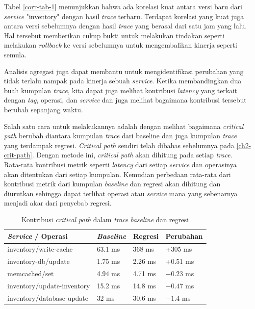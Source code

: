 Tabel \ref{corr-tab-1} menunjukkan bahwa ada korelasi kuat antara versi baru dari \textit{service} "inventory" dengan hasil \textit{trace} terbaru. Terdapat korelasi yang kuat juga antara versi sebelumnya dengan hasil \textit{trace} yang berasal dari satu jam yang lalu. Hal tersebut memberikan cukup bukti untuk melakukan tindakan seperti melakukan \textit{rollback} ke versi sebelumnya untuk mengembalikan kinerja seperti semula.

Analisis agregasi juga dapat membantu untuk mengidentifikasi perubahan yang tidak terlalu nampak pada kinerja sebuah \textit{service}. Ketika membandingkan dua buah kumpulan \textit{trace}, kita dapat juga melihat kontribusi \textit{latency} yang terkait dengan \textit{tag}, operasi, dan \textit{service} dan juga melihat bagaimana kontribusi tersebut berubah sepanjang waktu.

Salah satu cara untuk melakukannya adalah dengan melihat bagaimana \textit{critical path} berubah diantara kumpulan \textit{trace} dari baseline dan juga kumpulan \textit{trace} yang terdampak regresi. \textit{Critical path} sendiri telah dibahas sebelumnya pada \ref{ch2-crit-path}. Dengan metode ini, \textit{critical path} akan dihitung pada setiap \textit{trace}. Rata-rata kontribusi metrik seperti \textit{latency} dari setiap \textit{service} dan operasinya akan ditentukan dari setiap kumpulan. Kemudian perbedaan rata-rata dari kontribusi metrik dari kumpulan \textit{baseline} dan regresi akan dihitung dan diurutkan sehingga dapat terlihat operasi atau \textit{service} mana yang sebenarnya menjadi akar dari penyebab regresi.
\begin{small}
	\begin{longtable}{ | p{5cm} | p{2cm} | p{2cm} | p{2cm} | }
		\caption{Kontribusi \textit{critical path} dalam \textit{trace} \textit{baseline} dan regresi}
		\label{corr-tab-2}                                                           
		\\ \hline
		\centering\bfseries{\textit{Service} / Operasi} & \centering\bfseries{\textit{Baseline}} & \centering\bfseries{Regresi} & \centering\bfseries{Perubahan} \tabularnewline \hline
		\endfirsthead
		inventory/write-cache & 63.1 ms & 368 ms & +305 ms \\ \hline
		inventory-db/update & 1.75 ms & 2.26 ms & +0.51 ms \\ \hline
		memcached/set & 4.94 ms & 4.71 ms & $\num{-0.23}$ ms \\ \hline
		inventory/update-inventory & 15.2 ms & 14.8 ms & $\num{-0.47}$ ms \\ \hline
		inventory/database-update & 32 ms & 30.6 ms & $\num{-1.4}$ ms \\ \hline
	\end{longtable}
\end{small}


